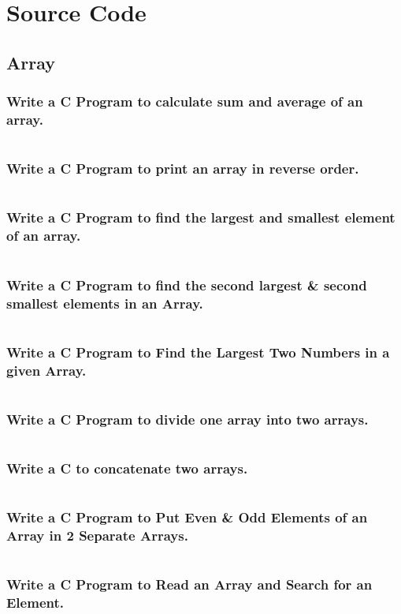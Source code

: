 \documentclass{article}
\begin{document}
\setcounter{page}{10}
\section*{Source Code}
\subsection{Array}
\subsubsection{Write a C Program to calculate sum and average of an array.}
\inputminted{C}{01.c}
\subsubsection{Write a C Program to print an array in reverse order.}
\inputminted{C}{02.c}
\subsubsection{Write a C Program to find the largest and smallest element of an array.}
\inputminted{C}{03.c}
\subsubsection{Write a C Program to find the second largest \& second smallest elements in an Array.}
\inputminted{C}{04.c}
\subsubsection{Write a C Program to Find the Largest Two Numbers in a given Array.}
\inputminted{C}{05.c}
\subsubsection{Write a C Program to divide one array into two arrays.}
\inputminted{C}{06.c}
\subsubsection{Write a C to concatenate two arrays.}
\inputminted{C}{07.c}
\subsubsection{Write a C Program to Put Even \& Odd Elements of an Array in 2 Separate Arrays.}
\inputminted{C}{08.c}
\subsubsection{Write a C Program to Read an Array and Search for an Element.}
\inputminted{C}{09.c}
\end{document}
